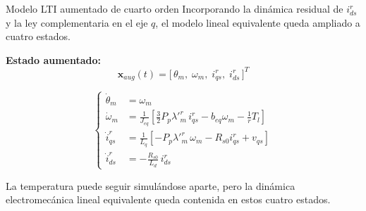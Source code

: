 \documentclass[aspectratio=169,t]{beamer}
\begin{document}
\begin{frame}{Modelo LTI aumentado de cuarto orden}
{\small\color{uncGray}Incorporando la dinámica residual de $i_{ds}^{r}$ y la ley complementaria en el eje $q$, el modelo lineal equivalente queda ampliado a cuatro estados.}\par
\vspace{2mm}

\textbf{Estado aumentado:}
\begin{equation*}
\bm{x}_{aug}(t)=\big[\,\theta_m,\;\omega_m,\;i_{qs}^r,\;i_{ds}^{r}\,\big]^T
\end{equation*}

\footnotesize
\begin{equation*}
\left\{
\begin{aligned}
\dot{\theta}_m &= \omega_m \\[2pt]
\dot{\omega}_m &= \frac{1}{J_{eq}}\!\left[\frac{3}{2}P_p\lambda'^r_m\,i_{qs}^r-b_{eq}\omega_m-\frac{1}{r}T_l\right] \\[4pt]
\dot{i}_{qs}^r &= \frac{1}{L_q}\!\left[-P_p\lambda'^r_m\,\omega_m-R_{s0}i_{qs}^r+v_{qs}\right] \\[4pt]
\dot{i}_{ds}^{r} &= -\frac{R_{s0}}{L_d}\,i_{ds}^{r}
\end{aligned}
\right.
\end{equation*}
\normalsize

{\small La temperatura puede seguir simulándose aparte, pero la dinámica electromecánica lineal equivalente queda contenida en estos cuatro estados.}
\end{frame}
\end{document}
